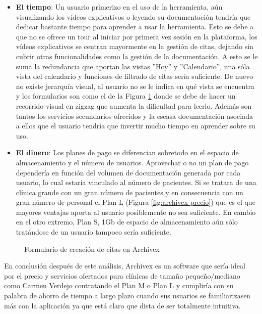 \begin{itemize}
    \item \textbf{El tiempo}: Un usuario primerizo en el uso de la herramienta, aún visualizando los vídeos explicativos o leyendo su documentación tendría que dedicar bastante tiempo para aprender a usar la herramienta. Esto se debe a que no se ofrece un tour al iniciar por primera vez sesión en la plataforma, los vídeos explicativos se centran mayormente en la gestión de citas, dejando sin cubrir otras funcionalidades como la gestión de la documentación. A esto se le suma la redundancia que aportan las vistas ''Hoy'' y ''Calendario'', una sóla vista del calendario y funciones de filtrado de citas sería suficiente. De nuevo no existe jerarquía visual, al usuario no se le indica en qué vista se encuentra y los formularios son como el de la Figura \ref{fig:archivex-crear-citas} donde se debe de hacer un recorrido visual en zigzag que aumenta la dificultad para leerlo. Además son tantos los servicios secundarios ofrecidos y la escasa documentación asociada a ellos que el usuario tendría que invertir mucho tiempo en aprender sobre su uso. 
    \item \textbf{El dinero}: Los planes de pago se diferencian sobretodo en el espacio de almacenamiento y el número de usuarios. Aprovechar o no un plan de pago dependería en función del volumen de documentación generada por cada usuario, lo cual estaría vinculado al número de pacientes. Si se tratara de una clínica grande con un gran número de pacientes y en consecuencia con un gran número de personal el Plan L (Figura \ref{fig:archivex-precio}) que es el que mayores ventajas aporta al usuario posiblemente no sea suficiente. En cambio en el otro extremo, Plan S, 1Gb de espacio de almacenamiento aún sólo tratándose de un usuario tampoco sería suficiente.
\end{itemize}

\begin{figure}[H]
    \caption{Formulario de creación de citas en Archivex}
    \label{fig:archivex-crear-citas}
\end{figure}

En conclusión después de este análisis, Archivex es un software que sería ideal por el precio y servicios ofertados para clínicas de tamaño pequeño/mediano como Carmen Verdejo contratando el Plan M o Plan L y cumpliría con su palabra de ahorro de tiempo a largo plazo cuando sus usuarios se familiarizasen más con la aplicación ya que está claro que dista de ser totalmente intuitiva. \bigskip
